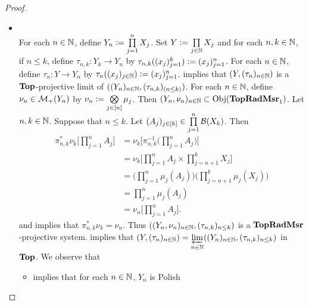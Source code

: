 \documentclass{book}
\begin{document}
	\begin{proof}\
		\begin{itemize}
			\item {} \\
			For each $n \in \mathbb{N}$, define $Y_n \vcentcolon= \prod\limits_{j=1}^n X_j$. Set $Y \vcentcolon= \prod\limits_{j \in \mathbb{N}} X_j$ and for each $n,k \in \mathbb{N}$, if $n \leq k$, define $\tau_{n,k}: Y_k \rightarrow Y_n$ by $\tau_{n,k}((x_j)_{j=1}^k) \vcentcolon= (x_j)_{j=1}^n$. For each $n \in \mathbb{N}$, define $\tau_n: Y \rightarrow Y_n$ by $\tau_n((x_j)_{j \in \mathbb{N}}) \vcentcolon= (x_j)_{j=1}^n$.  implies that $(Y, (\tau_n)_{n \in \mathbb{N}})$ is a $\operatorname*{\text{\textbf{Top}}}$-projective limit of $((Y_n)_{n \in \mathbb{N}}, (\tau_{n,k})_{(n \leq k)})$. For each $n \in \mathbb{N}$, define $\nu_n \in \mathcal{M}_+(Y_n)$ by $\nu_n \vcentcolon= \bigotimes\limits_{j \in [n]} \mu_j$.  Then $(Y_n, \nu_n)_{n \in \mathbb{N}} \subset \operatorname{Obj}(\operatorname{\text{\textbf{TopRadMsr}}_1})$. Let $n,k \in \mathbb{N}$. Suppose that $n \leq k$. Let $(A_j)_{j \in [k]} \in \prod\limits_{j=1}^n \mathcal{B}(X_k)$. Then
			\begin{align*}
				\pi_{n,k}^*\nu_k\bigg[ \prod\limits_{j=1}^n A_j \bigg] 
				& = \nu_k \bigg[ \pi_{n,k}^{-1} \bigg( \prod\limits_{j=1}^n A_j \bigg) \bigg] \\
				& = \nu_k \bigg[ \prod\limits_{j=1}^n A_j \times \prod\limits_{j=n+1}^k X_j \bigg] \\
				& = \bigg( \prod\limits_{j = 1}^n \mu_j(A_j)  \bigg) \bigg( \prod\limits_{j=n+1}^k \mu_j(X_j) \bigg) \\
				& = \prod\limits_{j = 1}^n \mu_j(A_j) \\
				& = \nu_n \bigg[ \prod\limits_{j=1}^n A_j \bigg].
			\end{align*}
			  and  implies that $\pi_{n,k}^*\nu_k = \nu_n$. Thus $((Y_n, \nu_n)_{n \in \mathbb{N}}, (\tau_{n,k})_{n \leq k})$ is a $\operatorname{\text{\textbf{TopRadMsr}}}$-projective system.  	implies that $(Y, (\tau_n)_{n \in \mathbb{N}}) = \varprojlim\limits_{n \in \mathbb{N}} ((Y_n)_{n \in \mathbb{N}}, (\tau_{n, k})_{n \leq k})$ in $\operatorname*{\text{\textbf{Top}}}$.  We observe that 
			\begin{itemize}
				\item {} implies that for each $n \in \mathbb{N}$, $Y_n$ is Polish

\end{itemize}
\end{itemize}
\end{proof}
\end{document}
